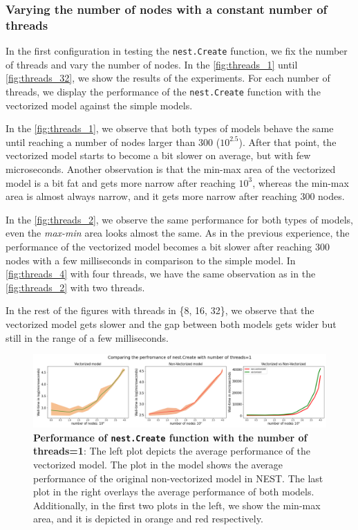 \subsubsection*{Varying the number of nodes with a constant number of threads}

 In the first configuration in testing the \texttt{nest.Create} function, we fix the number of threads and vary the number of nodes. In the  \autoref{fig:threads_1} until \autoref{fig:threads_32}, we show the results of the experiments. For each number of threads, we display the performance of the \texttt{nest.Create} function with the vectorized model against the simple models. 


In the \autoref{fig:threads_1}, we observe that both types of models behave the same until reaching a number of nodes larger than 300 ($10^{2.5}$). After that point, the vectorized model starts to become a bit slower on average, but with few microseconds. Another observation is that the min-max area of the vectorized model is a bit fat and gets more narrow after reaching $10^3$, whereas the min-max area is almost always narrow, and it gets more narrow after reaching 300 nodes.

In the \autoref{fig:threads_2}, we observe the same performance for both types of models, even the \emph{max-min} area looks almost the same. As in the previous experience, the performance of the vectorized model becomes a bit slower after reaching 300 nodes with a few milliseconds in comparison to the simple model. In  \autoref{fig:threads_4} with four threads, we have the same observation as in the  \autoref{fig:threads_2} with two threads.

In the rest of the figures with threads in \{8, 16, 32\}, we observe that the vectorized model gets slower and the gap between both models gets wider but still in the range of a few milliseconds.

\begin{figure}[ht!]
    \centering
    \includegraphics[width=\textwidth]{src/pic/thread_1.png}
    \caption{\textbf{Performance of \texttt{nest.Create} function with the number of threads=1}: The left plot depicts the average performance of the vectorized model. The plot in the model shows the average performance of the original non-vectorized model in NEST. The last plot in the right overlays the average performance of both models. Additionally, in the first two plots in the left, we show the min-max area, and it is depicted in orange and red respectively.}
    \label{fig:threads_1}
\end{figure}

